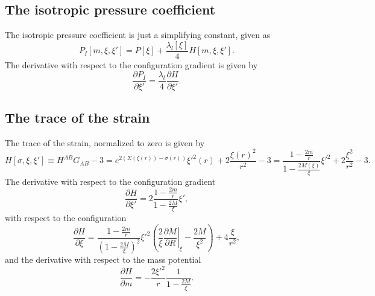 \subsection{The isotropic pressure coefficient}
The isotropic pressure coefficient is just a simplifying constant, given as
\begin{equation}
P_I[m,\xi,\xi'] = P[\xi] + \frac{\lambda_l[\xi]}{4}H[m,\xi,\xi'].
\label{eq:isotropicPressureExpanded}
\end{equation}
The derivative with respect to the configuration gradient is given by
\begin{equation}
\frac{\partial P_I}{\partial \xi'} = \frac{\lambda_l}{4}\frac{\partial H}{\partial \xi'}.
\label{eq:isotropicPressure:dxi}
\end{equation}

\subsection{The trace of the strain}
The trace of the strain, normalized to zero is given by
\begin{equation}
H[\sigma,\xi,\xi']\equiv H^{AB}G_{AB} -3= e^{2(\Sigma(\xi(r))-\sigma(r))}\xi'^2(r) +
2\frac{\xi(r)^2}{r^2} - 3 = \frac{1 - \frac{2m}{r}}{1 - \frac{2M(\xi)}{\xi}}\xi'^2 + 2\frac{\xi^2}{r^2} - 3.
\label{eq:traceExpanded}
\end{equation}
The derivative with respect to the configuration gradient
\begin{equation}
\frac{\partial H}{\partial \xi'} = 2\frac{1 - \frac{2m}{r}}{1 - \frac{2M}{\xi}}\xi',
\label{eq:dtrace:dxi}
\end{equation}
with respect to the configuration
\begin{equation}
\frac{\partial H}{\partial \xi} = \frac{1 - \frac{2m}{r}}{\left(1 - \frac{2M}{\xi}\right)^2}\xi'^2\left(\frac{2}{\xi}\left.\frac{\partial M}{\partial R}\right|_\xi - \frac{2M}{\xi^2}\right) + 4\frac{\xi}{r^2},
\label{eq:dtrace:xi}
\end{equation}
and the derivative with respect to the mass potential
\begin{equation}
\frac{\partial H}{\partial m} = -\frac{2\xi'^2}{r}\frac{1}{1 - \frac{2M}{\xi}}.
\label{eq:dtrace:m}
\end{equation}